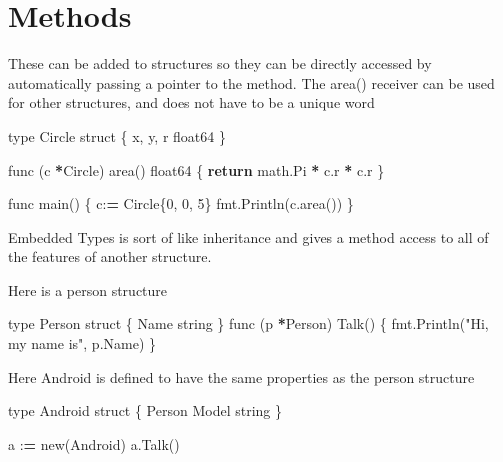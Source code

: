 \documentclass[]{book}
\newenvironment{Shaded}{\begin{snugshade}}{\end{snugshade}}
\newcommand{\BuiltInTok}[1]{#1}
\newcommand{\ControlFlowTok}[1]{\textcolor[rgb]{0.13,0.29,0.53}{\textbf{#1}}}
\newcommand{\DecValTok}[1]{\textcolor[rgb]{0.00,0.00,0.81}{#1}}
\newcommand{\NormalTok}[1]{#1}
\newcommand{\OperatorTok}[1]{\textcolor[rgb]{0.81,0.36,0.00}{\textbf{#1}}}
\newcommand{\StringTok}[1]{\textcolor[rgb]{0.31,0.60,0.02}{#1}}
\begin{document}
\hypertarget{methods}{%
\section{Methods}\label{methods}}

These can be added to structures so they can be directly accessed by automatically passing a pointer to the method. The area() receiver can be used for other structures, and does not have to be a unique word

\begin{Shaded}
\begin{Highlighting}[]
\BuiltInTok{type}\NormalTok{ Circle struct \{             }
\NormalTok{    x, y, r float64              }
\NormalTok{\}                                }
                                 
\NormalTok{func (c }\OperatorTok{*}\NormalTok{Circle) area() float64 \{}
    \ControlFlowTok{return}\NormalTok{ math.Pi }\OperatorTok{*}\NormalTok{ c.r }\OperatorTok{*}\NormalTok{ c.r   }
\NormalTok{\}                                }
                                 
\NormalTok{func main() \{                    }
\NormalTok{    c:}\OperatorTok{=}\NormalTok{ Circle\{}\DecValTok{0}\NormalTok{, }\DecValTok{0}\NormalTok{, }\DecValTok{5}\NormalTok{\}          }
\NormalTok{    fmt.Println(c.area())        }
\NormalTok{\}   }
\end{Highlighting}
\end{Shaded}

Embedded Types is sort of like inheritance and gives a method access to all of the features of another structure.

Here is a person structure

\begin{Shaded}
\begin{Highlighting}[]
\BuiltInTok{type}\NormalTok{ Person struct \{}
\NormalTok{  Name string}
\NormalTok{\}}
\NormalTok{func (p }\OperatorTok{*}\NormalTok{Person) Talk() \{}
\NormalTok{  fmt.Println(}\StringTok{"Hi, my name is"}\NormalTok{, p.Name)}
\NormalTok{\}}
\end{Highlighting}
\end{Shaded}

Here Android is defined to have the same properties as the person structure

\begin{Shaded}
\begin{Highlighting}[]
\BuiltInTok{type}\NormalTok{ Android struct \{}
\NormalTok{  Person}
\NormalTok{  Model string}
\NormalTok{\}}

\NormalTok{a :}\OperatorTok{=}\NormalTok{ new(Android)}
\NormalTok{a.Talk()}
\end{Highlighting}
\end{Shaded}
\end{document}
